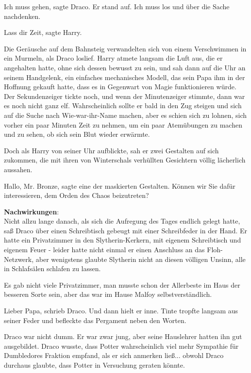 \glqq{}Ich muss gehen\grqq{}, sagte Draco. Er stand auf. \glqq{}Ich muss los und
über die Sache nachdenken.\grqq{}

\glqq{}Lass dir Zeit\grqq{}, sagte Harry.

Die Geräusche auf dem Bahnsteig verwandelten sich von einem Verschwimmen in ein
Murmeln, als Draco loslief. Harry atmete langsam die Luft aus, die er angehalten
hatte, ohne sich dessen bewusst zu sein, und sah dann auf die Uhr an seinem
Handgelenk, ein einfaches mechanisches Modell, das sein Papa ihm in der
Hoffnung gekauft hatte, dass es in Gegenwart von Magie funktionieren würde. Der
Sekundenzeiger tickte noch, und wenn der Minutenzeiger stimmte, dann war es noch
nicht ganz elf. Wahrscheinlich sollte er bald in den Zug steigen und sich auf
die Suche nach Wie-war-ihr-Name machen, aber es schien sich zu lohnen, sich
vorher ein paar Minuten Zeit zu nehmen, um ein paar Atemübungen zu machen und zu
sehen, ob sich sein Blut wieder erwärmte.

Doch als Harry von seiner Uhr aufblickte, sah er zwei Gestalten auf sich
zukommen, die mit ihren von Winterschals verhüllten Gesichtern völlig lächerlich
aussahen.

\glqq{}Hallo, Mr. Bronze\grqq{}, sagte eine der maskierten Gestalten. \glqq{}
Können wir Sie dafür interessieren, dem Orden des Chaos beizutreten?\grqq{}

\textbf{Nachwirkungen}:\\
Nicht allzu lange danach, als sich die Aufregung des Tages endlich gelegt hatte,
saß Draco über einen Schreibtisch gebeugt mit einer Schreibfeder in der Hand. Er
hatte ein Privatzimmer in den Slytherin-Kerkern, mit eigenem Schreibtisch und
eigenem Feuer - leider hatte nicht einmal er einen Anschluss an das
Floh-Netzwerk, aber wenigstens glaubte Slytherin nicht an diesen völligen
Unsinn, alle in Schlafsälen schlafen zu lassen.

Es gab nicht viele Privatzimmer, man musste schon der Allerbeste im Haus der
besseren Sorte sein, aber das war im Hause Malfoy selbstverständlich.

Lieber Papa, schrieb Draco. Und dann hielt er inne. Tinte tropfte langsam aus
seiner Feder und befleckte das Pergament neben den Worten.

Draco war nicht dumm. Er war zwar jung, aber seine Hauslehrer hatten ihn gut
ausgebildet. Draco wusste, dass Potter wahrscheinlich viel mehr Sympathie für
Dumbledores Fraktion empfand, als er sich anmerken ließ... obwohl Draco durchaus
glaubte, dass Potter in Versuchung geraten könnte.

